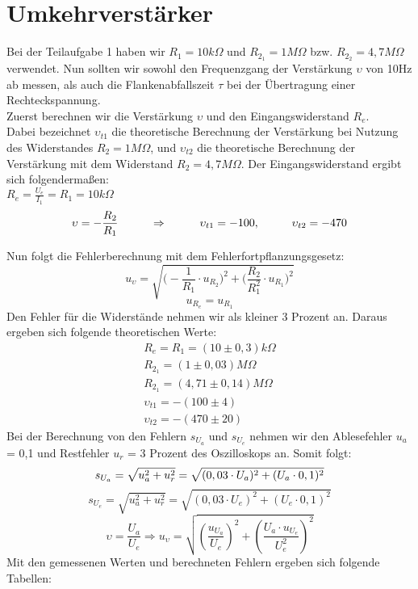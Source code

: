 

\section{Umkehrverstärker}
Bei der Teilaufgabe 1 haben wir $R_1=10k\Omega$ und $R_{2_1}=1M\Omega$ bzw. $R_{2_2}=4,7M\Omega$ verwendet. Nun sollten wir sowohl den Frequenzgang der Verstärkung $\upsilon$ von 10Hz ab messen, als auch die Flankenabfallszeit $\tau$ bei der Übertragung einer Rechteckspannung.\\
Zuerst berechnen wir die Verstärkung $\upsilon$ und den Eingangswiderstand $R_e$. \\
Dabei bezeichnet $\upsilon_{t1}$ die theoretische Berechnung der Verstärkung bei Nutzung des Widerstandes $R_2=1M\Omega$, und $\upsilon_{t2}$ die theoretische Berechnung der Verstärkung mit dem Widerstand $R_2=4,7M\Omega$. Der Eingangswiderstand ergibt sich folgendermaßen: \\
$R_e=\frac{U_e}{I_1}=R_1=10k\Omega$
\begin{equation}
\upsilon=-\frac{R_2}{R_1} \hspace*{1cm} \Rightarrow \hspace*{1cm} \upsilon_{t1}= -100, \hspace*{1cm} \upsilon_{t2}=-470
\end{equation}


Nun folgt die Fehlerberechnung mit dem Fehlerfortpflanzungsgesetz:
\begin{equation}
u_{\upsilon}=\sqrt{\bigl(-\frac{1}{R_1}\cdot u_{R_2}\bigr)^2 + {\bigl(\frac{R_2}{R_1^2}\cdot u_{R_1}\bigr)^2}}
\end{equation}
\begin{equation}
u_{R_e}=u_{R_1}
\end{equation}
Den Fehler für die Widerstände nehmen wir als kleiner 3 Prozent an. Daraus ergeben sich folgende theoretischen Werte:\\
\begin{align}
R_e=R_1=(10\pm 0,3)k\Omega\\
R_{2_1}=(1\pm 0,03)M\Omega\\
R_{2_1}=(4,71\pm 0,14)M\Omega\\
\upsilon_{t1}=-(100\pm4)\\
\upsilon_{t2}=-(470\pm20)
\end{align}
Bei der Berechnung von den Fehlern $s_{U_a}$ und $s_{U_e}$ nehmen wir den Ablesefehler $u_a$= 0,1 und Restfehler $u_r$ = 3 Prozent des Oszilloskops an. Somit folgt:
\begin{equation}
s_{U_a}=\sqrt{u_a^2+u_r^2}=\sqrt{(0,03 \cdot U_a)^2+(U_a\cdot 0,1)^2} \\
\end{equation}
\begin{equation}
s_{U_e}=\sqrt{u_a^2+u_r^2}=\sqrt{(0,03 \cdot U_e)^2+(U_e \cdot 0,1)^2} 
\end{equation}
\begin{equation}
\upsilon=\frac{U_a}{U_e} \Rightarrow u_\upsilon=\sqrt{(\frac{u_{U_a}}{U_e})^2+(\frac{U_a \cdot u_{U_e}}{U_e^2})^2}
\end{equation}
Mit den gemessenen Werten und berechneten Fehlern ergeben sich folgende Tabellen:

